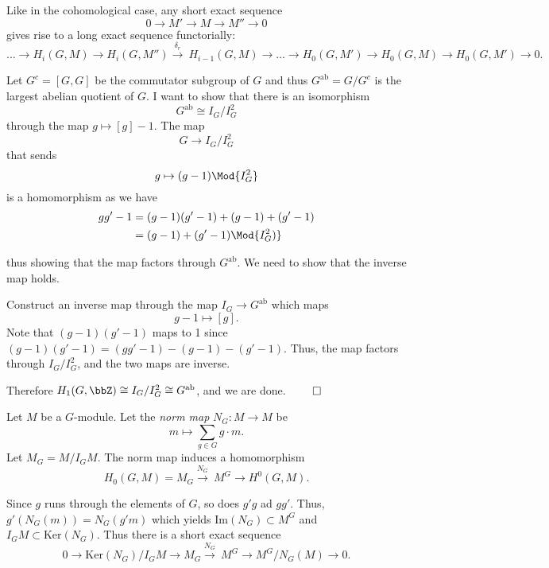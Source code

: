 \documentclass[a4paper, 12pt,oneside,openany]{book}
\begin{document}
Like in the cohomological case, any short exact sequence $$0 \to M' \to M \to M'' \to 0$$ gives rise to a long exact sequence functorially: $$\dots \to H_i(G, M) \to H_i(G, M'') \xrightarrow{\delta_r}\ H_{i-1}(G, M) \to \dots \to H_0(G, M') \to H_0(G, M) \to H_0(G, M') \to 0.$$



 Let $G^c = [G, G]$ be the commutator subgroup of $G$ and thus $G^{\text{ab}}=G/G^c$ is the largest abelian quotient of $G$. I want to show that there is an isomorphism $$G^{\text{ab}} \cong I_G/I_G^2$$ through the map $g \mapsto [g]-1$. The map $$G \to I_G/I_G^2$$ that sends $$g \mapsto (g-1) \Mod{I_G^2}$$ is a homomorphism as we have 
\begin{align*} gg'-1 &= (g-1)(g'-1)+(g-1)+(g'-1)\\
&= (g-1)+(g'-1) \Mod{I_G^2)}
\end{align*}

thus showing that the map factors through $G^{\text{ab}}$. We need to show that the inverse map holds. 

Construct an inverse map through the map $I_G\to G^{\text{ab}}$ which maps $$g-1 \mapsto [g].$$ Note that $(g-1)(g'-1)$ maps to 1 since $(g-1)(g'-1)=(gg'-1)-(g-1)-(g'-1)$. Thus, the map factors through $I_G/I_G^2$, and the two maps are inverse.

Therefore $H_1(G, \bbZ) \cong I_G/I_G^2 \cong G^{\text{ab}}$, and we are done. $\qed$

Let $M$ be a $G$-module. Let the \emph{norm map} $N_G: M\to M$ be $$m \mapsto \sum\limits_{g \in G} g\cdot m.$$ Let $M_G = M/ I_GM$. The norm map induces a homomorphism $$H_0(G, M) = M_G \xrightarrow{N_G}\ M^G \to H^0(G, M).$$

Since $g$ runs through the elements of $G$, so does $g'g$ ad $gg'$. Thus, $g'(N_G(m)) = N_G(g'm)$ which yields $\text{Im}(N_G) \subset M^G$ and $I_GM \subset \text{Ker}(N_G)$. Thus there is a short exact sequence $$0 \to \text{Ker}(N_G)/I_GM \to M_G \xrightarrow{N_G}\ M^G \to M^G/N_G(M) \to 0.$$
\end{document}
